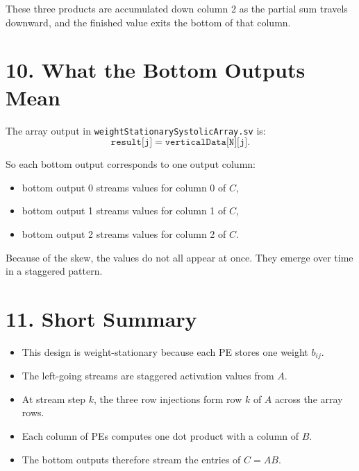 \documentclass[11pt]{article}
\begin{document}
These three products are accumulated down column 2 as the partial sum travels downward, and the finished value exits the bottom of that column.

\section*{10. What the Bottom Outputs Mean}

The array output in \texttt{weightStationarySystolicArray.sv} is:
\[
\texttt{result[j]} = \texttt{verticalData[N][j]}.
\]

So each bottom output corresponds to one output column:
\begin{itemize}
    \item bottom output 0 streams values for column 0 of $C$,
    \item bottom output 1 streams values for column 1 of $C$,
    \item bottom output 2 streams values for column 2 of $C$.
\end{itemize}

Because of the skew, the values do not all appear at once. They emerge over time in a staggered pattern.

\section*{11. Short Summary}

\begin{itemize}
    \item This design is weight-stationary because each PE stores one weight $b_{ij}$.
    \item The left-going streams are staggered activation values from $A$.
    \item At stream step $k$, the three row injections form row $k$ of $A$ across the array rows.
    \item Each column of PEs computes one dot product with a column of $B$.
    \item The bottom outputs therefore stream the entries of $C = AB$.
\end{itemize}
\end{document}

